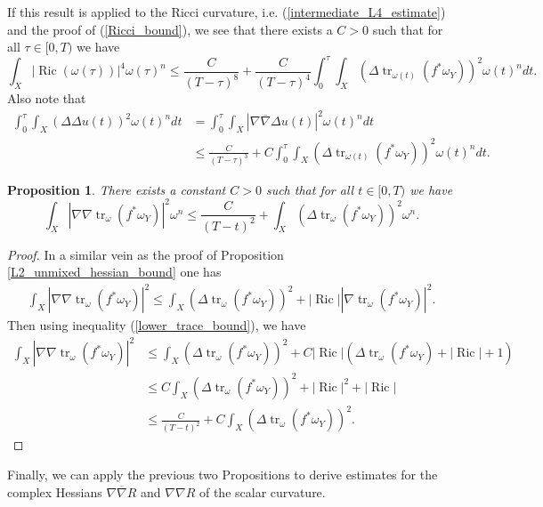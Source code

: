 \documentclass[12pt]{article}
\newtheorem{proposition}[theorem]{Proposition}
\numberwithin{equation}{section}
\DeclareMathOperator{\Ric}{Ric}
\DeclareMathOperator{\tr}{tr}
\newcommand{\oo}[1]{\overline{#1}}
\begin{document}
\noindent If this result is applied to the Ricci curvature,  i.e. (\ref{intermediate_L4_estimate}) and the proof of (\ref{Ricci_bound}), we see that there exists a $C > 0$ such that for all $\tau \in [0,T)$ we have
\begin{equation}\label{actual_L4_Ricci_bound}
    \int_X |\Ric(\omega(\tau))|^4 \omega(\tau)^n \leq \frac{C}{(T-\tau)^8} + \frac{C}{(T-\tau)^4} \int_0^\tau \int_X (\Delta \tr_{\omega(t)}(f^*\omega_Y))^2 \omega(t)^n dt. 
\end{equation}
Also note that
\begin{align*}
    \int_0^\tau \int_X (\Delta \Delta u(t))^2 \omega(t)^n dt &= \int_0^\tau \int_X |\nabla \oo{\nabla} \Delta u(t)|^2 \omega(t)^n dt\\
    &\leq \frac{C}{(T-\tau)^3} + C\int_0^\tau \int_X (\Delta \tr_{\omega(t)}(f^*\omega_Y))^2 \omega(t)^n dt.  
\end{align*}

\begin{proposition}
There exists a constant $C > 0$ such that for all $t \in [0,T)$ we have
\begin{equation*}
    \int_X |\nabla \nabla \tr_\omega(f^*\omega_Y)|^2 \omega^n \leq \frac{C}{(T-t)^2} + \int_X (\Delta \tr_\omega (f^*\omega_Y))^2 \omega^n.
\end{equation*}
\end{proposition}

\begin{proof}
In a similar vein as the proof of Proposition \ref{L2_unmixed_hessian_bound} one has
\begin{align*}
    \int_X |\nabla \nabla \tr_\omega(f^*\omega_Y)|^2 \leq \int_X (\Delta \tr_\omega(f^*\omega_Y))^2 + |\Ric| |\nabla \tr_\omega(f^*\omega_Y)|^2.
\end{align*}
Then using inequality (\ref{lower_trace_bound}), we have
\begin{align*}
    \int_X |\nabla \nabla \tr_\omega(f^*\omega_Y)|^2 &\leq \int_X (\Delta \tr_\omega(f^*\omega_Y))^2 + C|\Ric|(\Delta \tr_\omega(f^*\omega_Y) + |\Ric|+1)\\
    &\leq C\int_X (\Delta \tr_\omega(f^*\omega_Y))^2 + |\Ric|^2 + |\Ric|\\
    &\leq \frac{C}{(T-t)^2} + C\int_X (\Delta \tr_\omega (f^*\omega_Y))^2.
\end{align*}
\end{proof}

\noindent Finally, we can apply the previous two Propositions to derive estimates for the complex Hessians $\nabla \oo{\nabla} R$ and $\nabla \nabla R$ of the scalar curvature.
\end{document}
